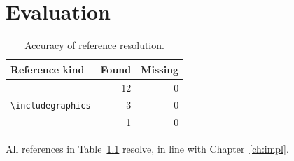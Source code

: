 \chapter{Evaluation}\label{ch:eval}

\begin{table}[ht]
  \centering
  \caption{Accuracy of reference resolution.}\label{tab:resolve}
  \begin{tabular}{lrr}
    \toprule
    Reference kind & Found & Missing \\
    \midrule
    \verb||        & 12 & 0 \\
    \verb|\includegraphics| & 3 & 0 \\
    \verb|| & 1 & 0 \\
    \bottomrule
  \end{tabular}
\end{table}

All references in Table~\ref{tab:resolve} resolve, in line with Chapter~\ref{ch:impl}.
